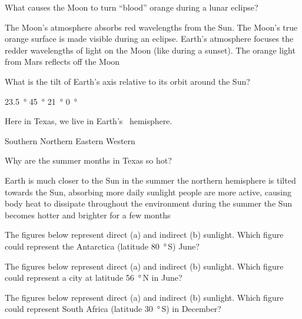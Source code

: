 \documentclass[addpoints]{exam}
\begin{document}
\begin{questions}
\question 
What causes the Moon to turn ``blood'' orange during a lunar eclipse?

\begin{choices}
    \choice The Moon's atmosphere absorbs red wavelengths from the Sun.
    \choice The Moon's true orange surface is made visible during an eclipse.
    \correctchoice Earth's atmosphere focuses the redder wavelengths of light on the Moon (like during a sunset).
    \choice The orange light from Mars reflects off the Moon
\end{choices}

\question
What is the tilt of Earth's axis relative to its orbit around the Sun?

\begin{choices}
    \correctchoice \SI{23.5}{\degree}
    \choice \SI{45}{\degree}
    \choice \SI{21}{\degree}
    \choice \SI{0}{\degree}
\end{choices}

\question
Here in Texas, we live in Earth's \fillin\ hemisphere.

\begin{choices}
    \choice Southern
    \correctchoice Northern
    \choice Eastern
    \choice Western
\end{choices}

\question
Why are the summer months in Texas so hot?

\begin{choices}
    \choice Earth is much closer to the Sun in the summer
    \correctchoice the northern hemisphere is tilted towards the Sun, absorbing more daily sunlight
    \choice people are more active, causing body heat to dissipate throughout the environment
    \choice during the summer the Sun becomes hotter and brighter for a few months
\end{choices}

\question
The figures below represent direct (a) and indirect (b) sunlight. Which figure could represent the Antarctica (latitude \SI{80}{\degree}\,S) June?

\question 
The figures below represent direct (a) and indirect (b) sunlight. Which figure could represent a city at latitude \SI{56}{\degree}\,N in June?

\question
The figures below represent direct (a) and indirect (b) sunlight. Which figure could represent South Africa (latitude \SI{30}{\degree}\,S) in December?


\end{questions}
\end{document}
